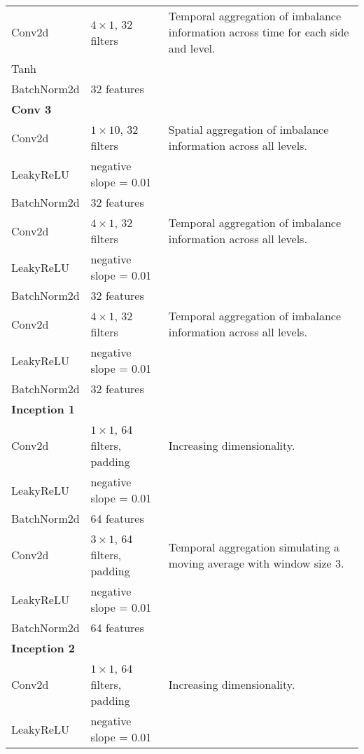 \begin{table}[ht]
{\begin{tabular}{|l|l|l|}
                \quad Conv2d & $4 \times 1$, 32 filters & Temporal aggregation of imbalance information across time for each side and level.\\
                \quad Tanh & & \\
                \quad BatchNorm2d & 32 features & \\
                \hline
                \textbf{Conv 3} & & \\
                \quad Conv2d & $1 \times 10$, 32 filters & Spatial aggregation of imbalance information across all levels.\\
                \quad LeakyReLU & negative slope = 0.01 & \\
                \quad BatchNorm2d & 32 features & \\
                \quad Conv2d & $4 \times 1$, 32 filters & Temporal aggregation of imbalance information across all levels.\\
                \quad LeakyReLU & negative slope = 0.01 & \\
                \quad BatchNorm2d & 32 features & \\
                \quad Conv2d & $4 \times 1$, 32 filters & Temporal aggregation of imbalance information across all levels.\\
                \quad LeakyReLU & negative slope = 0.01 & \\
                \quad BatchNorm2d & 32 features & \\
                \hline
                \textbf{Inception 1} & & \\
                \quad Conv2d & $1 \times 1$, 64 filters, padding  & Increasing dimensionality.\\
                \quad LeakyReLU & negative slope = 0.01 & \\
                \quad BatchNorm2d & 64 features & \\
                \quad Conv2d & $3 \times 1$, 64 filters, padding  & Temporal aggregation simulating a moving average with window size 3.\\
                \quad LeakyReLU & negative slope = 0.01 & \\
                \quad BatchNorm2d & 64 features & \\
                \hline
                \textbf{Inception 2} & & \\
                \quad Conv2d & $1 \times 1$, 64 filters, padding  & Increasing dimensionality.\\
                \quad LeakyReLU & negative slope = 0.01 & \\

\end{tabular}}
\end{table}
